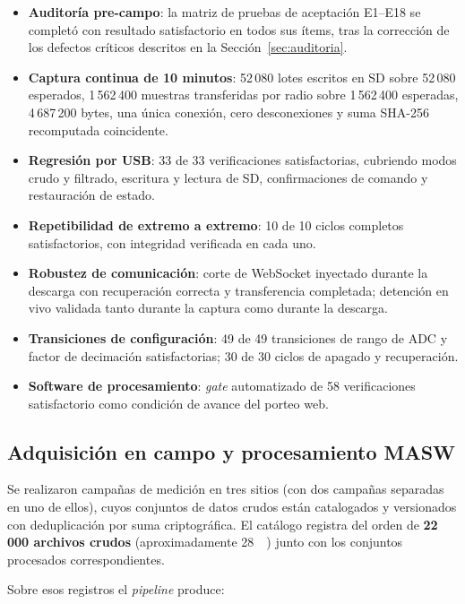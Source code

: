 \begin{itemize}[itemsep=0.2em]
    \item \textbf{Auditor\'ia pre-campo}: la matriz de pruebas de aceptaci\'on E1--E18 se
    complet\'o con resultado satisfactorio en todos sus \'items, tras la correcci\'on de los
    defectos cr\'iticos descritos en la Secci\'on~\ref{sec:auditoria}.
    \item \textbf{Captura continua de 10 minutos}: 52\,080 lotes escritos en SD sobre
    52\,080 esperados, 1\,562\,400 muestras transferidas por radio sobre 1\,562\,400
    esperadas, 4\,687\,200 bytes, una \'unica conexi\'on, cero desconexiones y suma
    SHA-256 recomputada coincidente.
    \item \textbf{Regresi\'on por USB}: 33 de 33 verificaciones satisfactorias, cubriendo
    modos crudo y filtrado, escritura y lectura de SD, confirmaciones de comando y
    restauraci\'on de estado.
    \item \textbf{Repetibilidad de extremo a extremo}: 10 de 10 ciclos completos
    satisfactorios, con integridad verificada en cada uno.
    \item \textbf{Robustez de comunicaci\'on}: corte de WebSocket inyectado durante la
    descarga con recuperaci\'on correcta y transferencia completada; detenci\'on en vivo
    validada tanto durante la captura como durante la descarga.
    \item \textbf{Transiciones de configuraci\'on}: 49 de 49 transiciones de rango de ADC
    y factor de decimaci\'on satisfactorias; 30 de 30 ciclos de apagado y recuperaci\'on.
    \item \textbf{Software de procesamiento}: \emph{gate} automatizado de 58
    verificaciones satisfactorio como condici\'on de avance del porteo web.
\end{itemize}

\subsection{Adquisici\'on en campo y procesamiento MASW}

Se realizaron campa\~nas de medici\'on en tres sitios (con dos campa\~nas separadas en uno
de ellos), cuyos conjuntos de datos crudos
est\'an catalogados y versionados con deduplicaci\'on por suma criptogr\'afica. El cat\'alogo
registra del orden de \textbf{22\,000 archivos crudos} (aproximadamente
\SI{28}{\gibi\byte}) junto con los conjuntos procesados correspondientes.

Sobre esos registros el \emph{pipeline} produce:

